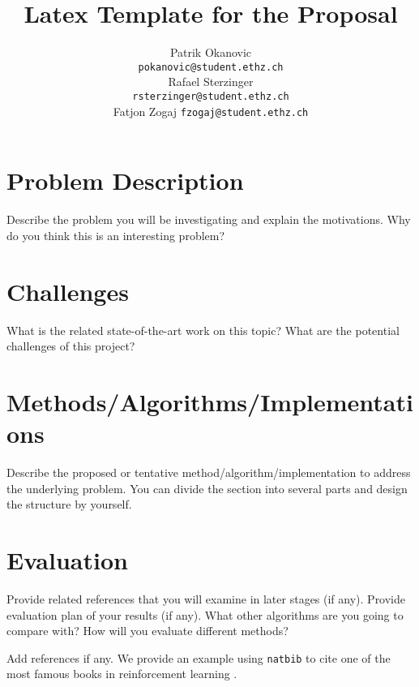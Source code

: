 \documentclass{article}
\title{Latex Template for the Proposal}
\author{
    Patrik Okanovic \\
    \texttt{pokanovic@student.ethz.ch} \\
    \And
    Rafael Sterzinger \\
    \texttt{rsterzinger@student.ethz.ch} \\
    \AND
    Fatjon Zogaj
    \texttt{fzogaj@student.ethz.ch} \\
}
\begin{document}
\maketitle

\section{Problem Description}
Describe the problem you will be investigating and explain the motivations. Why do you think this is an interesting problem?


\section{Challenges}
What is the related state-of-the-art work on this topic? What are the potential challenges of this project?


\section{Methods/Algorithms/Implementations}
Describe the proposed or tentative method/algorithm/implementation to address the underlying problem. You can divide the section into several parts and design the structure by yourself.


\section{Evaluation}
Provide related references that you will examine in later stages (if any). Provide evaluation plan of your results (if any). What other algorithms are you going to compare with? How will you evaluate different methods?


\medskip



Add references if any. We provide an example using \texttt{natbib} to cite one of the most famous books in reinforcement learning \cite{sutton2018reinforcement}.
\end{document}
